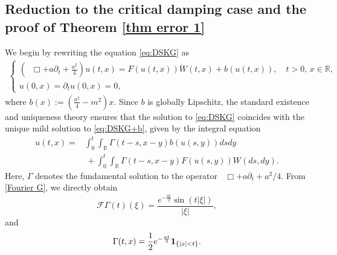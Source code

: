 \documentclass[11pt,reqno]{amsart}
\numberwithin{equation}{section}
\def\R{\mathbb{R}}
\newcommand{\1}{{\bf 1}}
\newcommand{\2}{{\bf 2}}
\newcommand*\DAlambert{\mathop{} \mathbin\Box}%
\begin{document}
  \subsection{Reduction to the critical damping case and the proof of Theorem \ref{thm error 1}}\label{s:reduction}
  We begin by  rewriting  the equation \eqref{eq:DSKG} as 
\begin{align}\label{eq:DSKG+b}
    \begin{cases}
        \left(\DAlambert + a\partial_t + \frac{a^2}{4}\right) u(t, x) = F(u(t, x))\dot{W} (t, x) + b(u(t, x)), \quad t>0, \, x\in \R,\\
        u(0,x) = \partial_t u(0,x) = 0,
    \end{cases}
\end{align}
where   $      b(x):= \left(\frac{a^2}{4}-m^2\right) x$. Since $b$ is globally Lipschitz, the  standard existence and uniqueness theory   ensures  that the solution   to \eqref{eq:DSKG} coincides with the unique mild solution to \eqref{eq:DSKG+b}, given by  the  integral equation 
\begin{equation}\label{eq:DSKG+b:mild}
\begin{split}
    u(t,x) =&    \int_0^t \int_\R \Gamma(t-s,x-y) b(u(s,y)) dsdy\\
    &\, +  \int_0^t \int_\R \Gamma(t-s, x-y) F(u(s, y))W(ds, dy).
\end{split}
\end{equation}
Here, $\Gamma$ denotes the fundamental solution to the operator $\DAlambert + a \partial_t + a^2/4$. From  \eqref{Fourier G}, we directly obtain  
 \begin{equation*} 
     \mathscr F \Gamma(t)(\xi) = \frac{e^{-\frac{at}{2}}\sin(t|\xi|)}{|\xi|}, 
     \end{equation*} 
     and   
      \begin{equation}\label{G: critical2}
     \Gamma(t,x) = \frac{1}{2} e^{-\frac{at}{2}} \1_{\{|x|< t\}}.   
\end{equation} 
\end{document}
